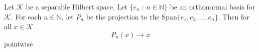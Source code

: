 \begin{remark}
  Let $\mathcal{K}$ be a separable Hilbert space. Let $\{ e_n \ : \ n \in
  \mathbb{N} \}$ be an orthonormal basis for $\mathcal{K}$.
  For each $n \in
  \mathbb{N}$, let $P_n$ be the projection to the $\textrm{Span}\{
  e_1 , e_2 , \ldots , e_n \}$. Then for all $ x \in \mathcal{K}$ \[
    P_n(x) \to x
  \]
  pointwise
\end{remark}

